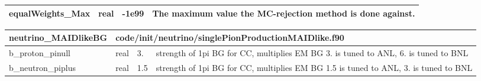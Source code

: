 \documentclass{article}
\begin{document}
\begin{longtable}{llll}
\midrule
equalWeights\_Max & \begin{minipage}[t]{2cm}real\end{minipage} & \begin{minipage}[t]{2cm}-1e99\end{minipage} & \begin{minipage}[t]{12cm}The maximum value the MC-rejection method is done against.\end{minipage}\\*
\bottomrule
\end{longtable}
{ }




\begin{longtable}{llll}
\toprule
\textbf{\large{neutrino\_MAIDlikeBG}} & \multicolumn{3}{l}{\footnotesize{code/init/neutrino/singlePionProductionMAIDlike.f90}}\\*
\midrule
\endfirsthead
\midrule
\endhead
b\_proton\_pinull & \begin{minipage}[t]{2cm}real\end{minipage} & \begin{minipage}[t]{2cm}3.\end{minipage} & \begin{minipage}[t]{12cm}strength of 1pi BG for CC, multiplies EM BG 3. is  tuned to ANL, 6. is tuned to BNL\end{minipage}\\*
\midrule
b\_neutron\_piplus & \begin{minipage}[t]{2cm}real\end{minipage} & \begin{minipage}[t]{2cm}1.5\end{minipage} & \begin{minipage}[t]{12cm}strength of 1pi BG for CC, multiplies EM BG 1.5 is tuned to ANL, 3. is tuned to BNL\end{minipage}\\*
\bottomrule
\end{longtable}
{ }



\end{document}

